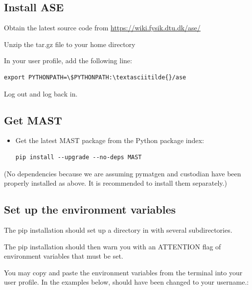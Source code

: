 \documentclass[letterpaper,10pt,english]{sphinxmanual}
\begin{document}
\subsection{Install ASE}
\label{1_0_installation:install-ase}
Obtain the latest source code from \href{https://wiki.fysik.dtu.dk/ase/}{https://wiki.fysik.dtu.dk/ase/}

Unzip the tar.gz file to your home directory

In your user profile, add the following line:

\begin{Verbatim}[commandchars=\\\{\}]
export PYTHONPATH=\$PYTHONPATH:\textasciitilde{}/ase
\end{Verbatim}

Log out and log back in.


\subsection{Get MAST}
\label{1_0_installation:get-mast}\begin{itemize}
\item {} 
Get the latest MAST package from the Python package index:

\begin{Verbatim}[commandchars=\\\{\}]
pip install --upgrade --no-deps MAST
\end{Verbatim}

\end{itemize}

(No dependencies because we are assuming pymatgen and custodian have been properly installed as above. It is recommended to install them separately.)


\subsection{Set up the environment variables}
\label{1_0_installation:set-up-the-environment-variables}
The pip installation should set up a  directory in  with several subdirectories.

The pip installation should then warn you with an ATTENTION flag of environment variables that must be set.

You may copy and paste the environment variables from the terminal into your user profile. In the examples below,  should have been changed to your username.:
\end{document}

